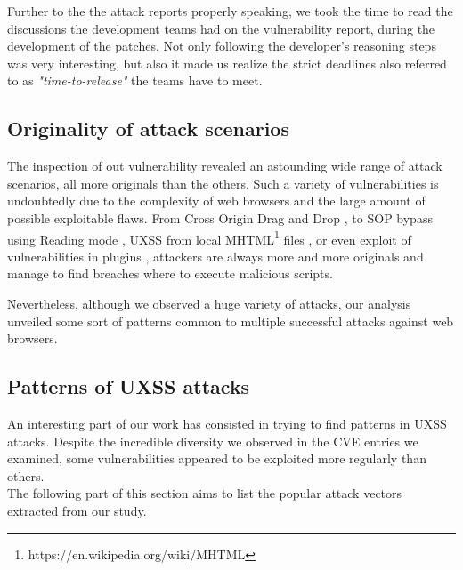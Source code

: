 \documentclass[journal]{IEEEtran}
\begin{document}
\medskip

Further to the the attack reports properly speaking, we took the time to read the discussions the development teams had on the vulnerability report, during the development of the patches. Not only following the developer's reasoning steps was very interesting, but also it made us realize the strict deadlines also referred to as \emph{"time-to-release"} the teams have to meet.


\subsection{Originality of attack scenarios}

The inspection of out vulnerability revealed an astounding wide range of attack scenarios, all more originals than the others. Such a variety of vulnerabilities is undoubtedly due to the complexity of web browsers and the large amount of possible exploitable flaws. From Cross Origin Drag and Drop \cite{CVE-2013-2849}, to SOP bypass using Reading mode \cite{edgeReadingModeUXSS}, UXSS from local MHTML\footnote{https://en.wikipedia.org/wiki/MHTML} files \cite{CVE-2014-1747}, or even exploit of vulnerabilities in plugins \cite{uxssPDF} \cite{uxssKeybase}, attackers are always more and more originals and manage to find breaches where to execute malicious scripts.

\medskip

Nevertheless, although we observed a huge variety of attacks, our analysis unveiled some sort of patterns common to multiple successful attacks against web browsers.

\subsection{Patterns of UXSS attacks}

An interesting part of our work has consisted in trying to find patterns in UXSS attacks. Despite the incredible diversity we observed in the CVE entries we examined, some vulnerabilities appeared to be exploited more regularly than others. \\
The following part of this section aims to list the popular attack vectors extracted from our study.

\medskip
\end{document}
